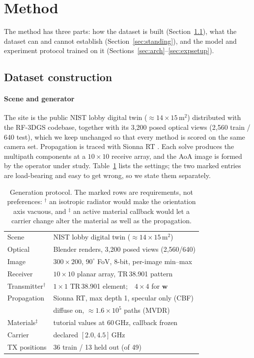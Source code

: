 \documentclass[conference]{IEEEtran}
\begin{document}
\section{Method}
\label{sec:method}

The method has three parts: how the dataset is built (Section~\ref{sec:data}),
what the dataset can and cannot establish (Section~\ref{sec:standing}), and the
model and experiment protocol trained on it
(Sections~\ref{sec:arch}--\ref{sec:expsetup}).

\subsection{Dataset construction}
\label{sec:data}

\paragraph{Scene and generator}
The site is the public NIST lobby digital twin ($\approx14\times15$\,m$^2$)
distributed with the RF-3DGS codebase, together with its 3{,}200 posed optical
views (2{,}560 train / 640 test), which we keep unchanged so that every method
is scored on the same camera set. Propagation is traced with Sionna RT
\cite{sionna,sionnart}. Each solve produces the multipath components at a
$10\times10$ receive array, and the AoA image is formed by the operator under
study. Table~\ref{tab:protocol} lists the settings; the two marked entries are
load-bearing and easy to get wrong, so we state them separately.

\begin{table}[!t]
\centering
\caption{Generation protocol. The marked rows are requirements, not preferences:
$^\dagger$ an isotropic radiator would make the orientation axis vacuous, and
$^\ddagger$ an active material callback would let a carrier change alter the
material as well as the propagation.}
\label{tab:protocol}
\small
\setlength{\tabcolsep}{3.5pt}
\begin{tabular}{@{}l@{\hspace{4pt}}l@{}}
\toprule
Scene & NIST lobby digital twin ($\approx14\times15$\,m$^2$) \\
Optical & Blender renders, 3{,}200 posed views (2{,}560/640) \\
Image & $300\times200$, $90^\circ$ FoV, 8-bit, per-image min--max \\
Receiver & $10\times10$ planar array, TR\,38.901 pattern \\
Transmitter$^\dagger$ & $1\times1$ TR\,38.901 element;\ \ $4\times4$ for $\mathbf{w}$ \\
Propagation & Sionna RT, max depth 1, specular only (CBF) \\
 & diffuse on, $\approx1.6\times10^{5}$ paths (MVDR) \\
Materials$^\ddagger$ & tutorial values at 60\,GHz, callback frozen \\
Carrier & declared $[2.0,4.5]$\,GHz \\
TX positions & 36 train / 13 held out (of 49) \\
\bottomrule
\end{tabular}
\end{table}
\end{document}
